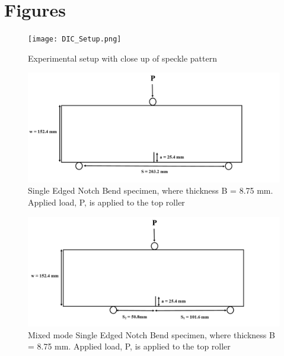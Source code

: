 \documentclass[12pt]{article}
\begin{document}
\section{Figures}
\begin{figure}[H]
	\centering
	\texttt{[image: DIC\_Setup.png]}
	\caption{Experimental setup with close up of speckle pattern}
	\label{fig:DIC}
\end{figure}

\begin{figure}[H]
	\centering
	\includegraphics[width=1\textwidth]{Geometry.png}
	\caption{Single Edged Notch Bend specimen, where thickness B = 8.75 mm. Applied load, P, is applied to the top roller}
	\label{fig:Geometry}
\end{figure}

\begin{figure}[H]
	\centering
	\includegraphics[width=1\textwidth]{Geometry_Mixed.png}
	\caption{Mixed mode Single Edged Notch Bend specimen, where thickness B = 8.75 mm. Applied load, P, is applied to the top roller}
	\label{fig:Geometry_Mixed}
\end{figure}
\end{document}
